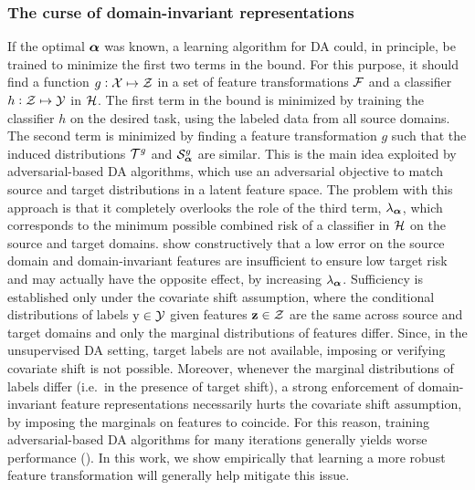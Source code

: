 \subsubsection{The curse of domain-invariant representations}
\label{sec:modafm_domain_invariance}
If the optimal ${\bm{\alpha}}$ was known, a learning algorithm for DA could, in principle, be trained to minimize the first two terms in the bound. For this purpose, it should find a function $g:{\mathcal{X}} \mapsto {\mathcal{Z}}$ in a set of feature transformations ${\mathcal{F}}$ and a classifier $h: {\mathcal{Z}} \mapsto {\mathcal{Y}}$ in ${\mathcal{H}}$. The first term in the bound is minimized by training the classifier $h$ on the desired task, using the labeled data from all source domains. The second term is minimized by finding a feature transformation $g$ such that the induced distributions ${\mathcal{T}}^g$ and ${\mathcal{S}}_{\bm{\alpha}}^g$ are similar. This is the main idea exploited by adversarial-based DA algorithms, which use an adversarial objective to match source and target distributions in a latent feature space. The problem with this approach is that it completely overlooks the role of the third term, $\lambda_{\bm{\alpha}}$, which corresponds to the minimum possible combined risk of a classifier in ${\mathcal{H}}$ on the source and target domains. \citet{Zhao2019} show constructively that a low error on the source domain and domain-invariant features are insufficient to ensure low target risk and may actually have the opposite effect, by increasing $\lambda_{\bm{\alpha}}$. Sufficiency is established only under the covariate shift assumption, where the conditional distributions of labels ${\textnormal{y}} \in {\mathcal{Y}}$ given features ${\mathbf{z}} \in {\mathcal{Z}}$ are the same across source and target domains and only the marginal distributions of features differ. Since, in the unsupervised DA setting, target labels are not available, imposing or verifying covariate shift is not possible. Moreover, whenever the marginal distributions of labels differ (i.e.\ in the presence of target shift), a strong enforcement of domain-invariant feature representations necessarily hurts the covariate shift assumption, by imposing the marginals on features to coincide. For this reason, training adversarial-based DA algorithms for many iterations generally yields worse performance (\citet{Zhao2019}). In this work, we show empirically that learning a more robust feature transformation will generally help mitigate this issue.

